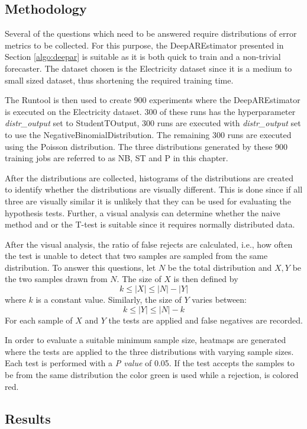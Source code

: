 \subsection{Methodology}
\label{hypothesis_test_methodology}
Several of the questions which need to be answered require distributions of error metrics to be collected. For this purpose, the DeepAREstimator presented in Section \ref{algo:deepar} is suitable as it is both quick to train and a non-trivial forecaster. The dataset chosen is the Electricity dataset since it is a medium to small sized dataset, thus shortening the required training time.

The Runtool is then used to create 900 experiments where the DeepAREstimator is executed on the Electricity dataset. 300 of these runs has the hyperparameter \textit{distr\_output} set to StudentTOutput, 300 runs are executed with \textit{distr\_output} set to use the NegativeBinomialDistribution. The remaining 300 runs are executed using the Poisson distribution. The three distributions generated by these 900 training jobs are referred to as NB, ST and P in this chapter.

After the distributions are collected, histograms of the distributions are created to identify whether the distributions are visually different. This is done since if all three are visually similar it is unlikely that they can be used for evaluating the hypothesis tests. Further, a visual analysis can determine whether the naive method and or the T-test is suitable since it requires normally distributed data.

After the visual analysis, the ratio of false rejects are calculated, i.e., how often the test is unable to detect that two samples are sampled from the same distribution. To answer this questions, let \(N\) be the total distribution and \(X,Y\) be the two samples drawn from \(N\). The size of \(X\) is then defined by \[k \leq |X| \leq |N| - |Y|\] where \(k\) is a constant value. Similarly, the size of \(Y\) varies between: \[k	\leq |Y| \leq |N|-k\] For each sample of \(X\) and \(Y\) the tests are applied and false negatives are recorded.

In order to evaluate a suitable minimum sample size, heatmaps are generated where the tests are applied to the three distributions with varying sample sizes. Each test is performed with a \textit{P value} of 0.05. If the test accepts the samples to be from the same distribution the color green is used while a rejection, is colored red.

\subsection{Results}

